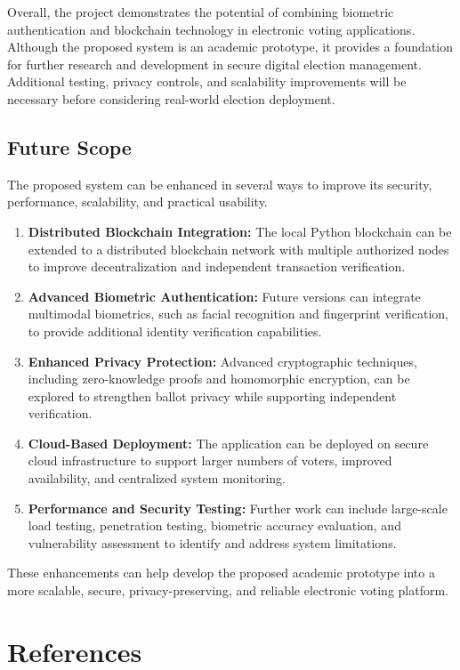 \documentclass[12pt]{report}
\begin{document}
	Overall, the project demonstrates the potential of combining biometric authentication and blockchain technology in electronic voting applications. Although the proposed system is an academic prototype, it provides a foundation for further research and development in secure digital election management. Additional testing, privacy controls, and scalability improvements will be necessary before considering real-world election deployment.
	
	\section{Future Scope}
	The proposed system can be enhanced in several ways to improve its security, performance, scalability, and practical usability.
	
	\begin{enumerate}
		\item \textbf{Distributed Blockchain Integration:} The local Python blockchain can be extended to a distributed blockchain network with multiple authorized nodes to improve decentralization and independent transaction verification.
		\item \textbf{Advanced Biometric Authentication:} Future versions can integrate multimodal biometrics, such as facial recognition and fingerprint verification, to provide additional identity verification capabilities.
		\item \textbf{Enhanced Privacy Protection:} Advanced cryptographic techniques, including zero-knowledge proofs and homomorphic encryption, can be explored to strengthen ballot privacy while supporting independent verification.
		\item \textbf{Cloud-Based Deployment:} The application can be deployed on secure cloud infrastructure to support larger numbers of voters, improved availability, and centralized system monitoring.
		\item \textbf{Performance and Security Testing:} Further work can include large-scale load testing, penetration testing, biometric accuracy evaluation, and vulnerability assessment to identify and address system limitations.
	\end{enumerate}
	
	\vspace{0.3cm}
	\noindent These enhancements can help develop the proposed academic prototype into a more scalable, secure, privacy-preserving, and reliable electronic voting platform.
	
	\newpage
	\chapter*{References}
	
\end{document}
